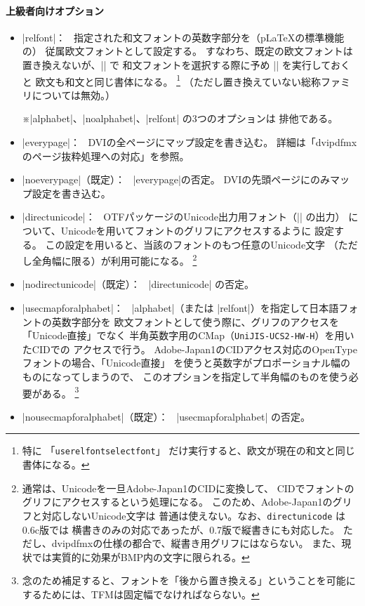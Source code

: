 \documentclass[a4paper,uplatex]{jsarticle}
\newcommand{\Pkg}[1]{\textsf{#1}}
\newcommand{\Note}{\par\noindent ※}
\newcommand{\Means}{：\ }
\providecommand{\pLaTeX}{p\LaTeX}
\begin{document}
\paragraph{上級者向けオプション}
\begin{itemize}
\item |relfont|\Means
  指定された和文フォントの英数字部分を（{\pLaTeX}の標準機能の）
  従属欧文フォントとして設定する。
  すなわち、既定の欧文フォントは置き換えないが、|\selectfont| で
  和文フォントを選択する際に予め |\userelfont| を実行しておくと
  欧文も和文と同じ書体になる。
  \inhibitglue\footnote{特に
  「\texttt{userelfontselectfont}」
  だけ実行すると、欧文が現在の和文と同じ書体になる。}
  （ただし置き換えていない総称ファミリについては無効。）
  \Note |alphabet|、|noalphabet|、|relfont| の3つのオプションは
  排他である。
\item |everypage|\Means
  DVIの全ページにマップ設定を書き込む。
  詳細は「dvipdfmx のページ抜粋処理への対応」を参照。
\item |noeverypage|（既定）\Means
  |everypage|の否定。
  DVIの先頭ページにのみマップ設定を書き込む。
\item |directunicode|\Means
  \Pkg{OTF}パッケージのUnicode出力用フォント（|\UTF{}| の出力）
  について、Unicodeを用いてフォントのグリフにアクセスするように
  設定する。
  この設定を用いると、当該のフォントのもつ任意のUnicode文字
  （ただし全角幅に限る）が利用可能になる。
  \footnote{通常は、Unicodeを一旦Adobe-Japan1のCIDに変換して、
  CIDでフォントのグリフにアクセスするという処理になる。
  このため、Adobe-Japan1のグリフと対応しないUnicode文字は
  普通は使えない。なお、\texttt{directunicode} は0.6c版では
  横書きのみの対応であったが、0.7版で縦書きにも対応した。
  ただし、dvipdfmxの仕様の都合で、縦書き用グリフにはならない。
  また、現状では実質的に効果がBMP内の文字に限られる。}
\item |nodirectunicode|（既定）\Means
  |directunicode| の否定。
\item |usecmapforalphabet|\Means
  |alphabet|（または |relfont|）を指定して日本語フォントの英数字部分を
  欧文フォントとして使う際に、グリフのアクセスを「Unicode直接」でなく
  半角英数字用のCMap（\texttt{UniJIS-UCS2-HW-H}）を用いたCIDでの
  アクセスで行う。
  Adobe-Japan1のCIDアクセス対応のOpenTypeフォントの場合、「Unicode直接」
  を使うと英数字がプロポーショナル幅のものになってしまうので、
  このオプションを指定して半角幅のものを使う必要がある。
  \inhibitglue\footnote{%
  念のため補足すると、フォントを「後から置き換える」ということを可能に
  するためには、TFMは固定幅でなければならない。}
\item |nousecmapforalphabet|（既定）\Means
  |usecmapforalphabet| の否定。
\end{itemize}
\end{document}
